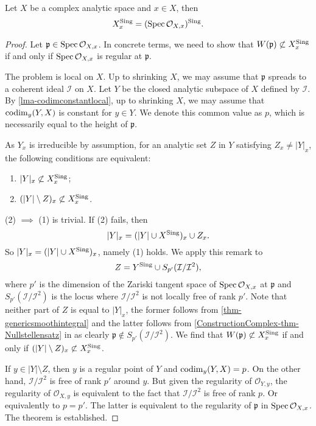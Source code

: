 \begin{thm}[Abhyankar]\label{thm:Abhyansinglocus}
    Let $X$ be a complex analytic space and $x\in X$, then
    \[
        X^{\operatorname{Sing}}_x=(\operatorname{Spec} \mathcal{O}_{X,x})^{\operatorname{Sing}}.  
    \]
\end{thm}
\begin{proof}
    Let $\mathfrak{p}\in \operatorname{Spec} \mathcal{O}_{X,x}$. In concrete terms, we need to show that $W(\mathfrak{p})\not\subset X^{\operatorname{Sing}}_x$ if and only if $\operatorname{Spec} \mathcal{O}_{X,x}$ is regular at $\mathfrak{p}$.
    
    
    The problem is local on $X$. Up to shrinking $X$, we may assume that $\mathfrak{p}$ spreads to a coherent ideal $\mathcal{I}$ on $X$. Let $Y$ be the closed analytic subspace of $X$ defined by $\mathcal{I}$. By \cref{lma-codimconstantlocal}, up to shrinking $X$, we may assume that $\operatorname{codim}_y(Y,X)$ is constant for $y\in Y$. We denote this common value as $p$, which is necessarily equal to the height of $\mathfrak{p}$.

    As $Y_x$ is irreducible by assumption, for an analytic set $Z$ in $Y$ satisfying $Z_x\neq |Y|_x$, the following conditions are equivalent:
    \begin{enumerate}
        \item $|Y|_x\not\subset X^{\operatorname{Sing}}_x$;
        \item $(|Y|\setminus Z)_x \not\subset X^{\operatorname{Sing}}_x$.
    \end{enumerate}
    (2) $\implies$ (1) is trivial. If (2) fails, then 
    \[
        |Y|_x= (|Y|\cup X^{\operatorname{Sing}})_x\cup Z_x.  
    \]
    So $|Y|_x=(|Y|\cup X^{\operatorname{Sing}})_x$, namely (1) holds. We apply this remark to 
    \[
        Z=Y^{\operatorname{Sing}} \cup S_{p'}(\mathcal{I}/\mathcal{I}^2), 
    \]
    where $p'$ is the dimension of the Zariski tangent space of $\operatorname{Spec} \mathcal{O}_{X,x}$ at $\mathfrak{p}$ and $S_{p'}(\mathcal{I}/\mathcal{I}^2)$ is the locus where $\mathcal{I}/\mathcal{I}^2$ is not locally free of rank $p'$. Note that neither part of $Z$ is equal to $|Y|_x$, the former follows from  \cref{thm-genericsmoothintegral} and the latter follows from \cref{ConstructionComplex-thm-Nullstellensatz} in  as clearly $\mathfrak{p}\not\in S_{p'}(\mathcal{I}/\mathcal{I}^2)$. 
    We find that $W(\mathfrak{p})\not\subset X^{\operatorname{Sing}}_x$ if and only if $(|Y|\setminus Z)_x \not\subset X^{\operatorname{Sing}}_x$.
    
    If $y\in |Y|\setminus Z$, then $y$ is a regular point of $Y$ and $\operatorname{codim}_y(Y,X)=p$. On the other hand, $\mathcal{I}/\mathcal{I}^2$ is free of rank $p'$ around $y$. But given the regularity of $\mathcal{O}_{Y,y}$, the regularity of $\mathcal{O}_{X,y}$ is equivalent to the fact that $\mathcal{I}/\mathcal{I}^2$ is free of rank $p$. Or equivalently to $p=p'$. The latter is equivalent to the regularity of $\mathfrak{p}$ in $\operatorname{Spec} \mathcal{O}_{X,x}$. The theorem is established.
\end{proof}


